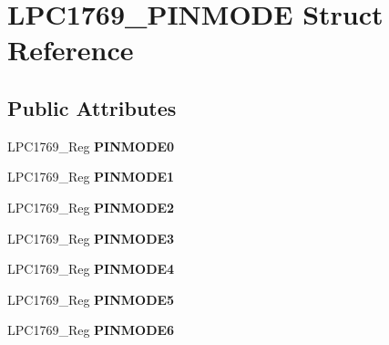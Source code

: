 \hypertarget{struct_l_p_c1769___p_i_n_m_o_d_e}{\section{L\+P\+C1769\+\_\+\+P\+I\+N\+M\+O\+D\+E Struct Reference}
\label{struct_l_p_c1769___p_i_n_m_o_d_e}
}
\subsection*{Public Attributes}
\begin{DoxyCompactItemize}
\item 
\hypertarget{struct_l_p_c1769___p_i_n_m_o_d_e_a1c12175661dbf8c5b352730468d92df6}{L\+P\+C1769\+\_\+\+Reg {\bfseries P\+I\+N\+M\+O\+D\+E0}}\label{struct_l_p_c1769___p_i_n_m_o_d_e_a1c12175661dbf8c5b352730468d92df6}

\item 
\hypertarget{struct_l_p_c1769___p_i_n_m_o_d_e_af704288f13d306e396a2ec94e3e4fac9}{L\+P\+C1769\+\_\+\+Reg {\bfseries P\+I\+N\+M\+O\+D\+E1}}\label{struct_l_p_c1769___p_i_n_m_o_d_e_af704288f13d306e396a2ec94e3e4fac9}

\item 
\hypertarget{struct_l_p_c1769___p_i_n_m_o_d_e_a662b46134622ab318190677766a8a46f}{L\+P\+C1769\+\_\+\+Reg {\bfseries P\+I\+N\+M\+O\+D\+E2}}\label{struct_l_p_c1769___p_i_n_m_o_d_e_a662b46134622ab318190677766a8a46f}

\item 
\hypertarget{struct_l_p_c1769___p_i_n_m_o_d_e_a1e0ecec1e76f240f37bd1d5784256ae1}{L\+P\+C1769\+\_\+\+Reg {\bfseries P\+I\+N\+M\+O\+D\+E3}}\label{struct_l_p_c1769___p_i_n_m_o_d_e_a1e0ecec1e76f240f37bd1d5784256ae1}

\item 
\hypertarget{struct_l_p_c1769___p_i_n_m_o_d_e_af6feaf7b1a07f20ad12f1ddc71d8ff8d}{L\+P\+C1769\+\_\+\+Reg {\bfseries P\+I\+N\+M\+O\+D\+E4}}\label{struct_l_p_c1769___p_i_n_m_o_d_e_af6feaf7b1a07f20ad12f1ddc71d8ff8d}

\item 
\hypertarget{struct_l_p_c1769___p_i_n_m_o_d_e_a7198aed92e17fe3a76ab4da20f1b8a26}{L\+P\+C1769\+\_\+\+Reg {\bfseries P\+I\+N\+M\+O\+D\+E5}}\label{struct_l_p_c1769___p_i_n_m_o_d_e_a7198aed92e17fe3a76ab4da20f1b8a26}

\item 
\hypertarget{struct_l_p_c1769___p_i_n_m_o_d_e_a3c0efdbdfc7a3e2ccd18821289384447}{L\+P\+C1769\+\_\+\+Reg {\bfseries P\+I\+N\+M\+O\+D\+E6}}\label{struct_l_p_c1769___p_i_n_m_o_d_e_a3c0efdbdfc7a3e2ccd18821289384447}


\end{DoxyCompactItemize}
